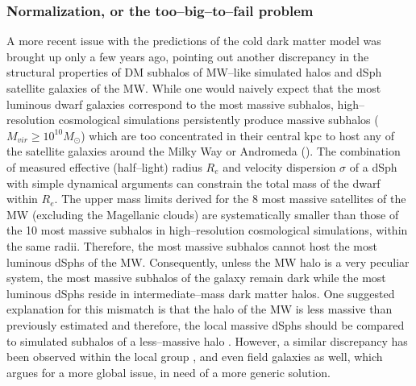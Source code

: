 \documentclass[paper=a4, fontsize=11pt]{scrartcl} %
\numberwithin{equation}{section} %
\numberwithin{figure}{section} %
\numberwithin{table}{section} %
\begin{document}
\subsubsection{Normalization, or the too--big--to--fail problem}
\label{subsec:too-big-to-fail}
A more recent issue with the predictions of the cold dark matter model was brought up only a few years ago, pointing out another discrepancy in the structural properties of DM subhalos of MW--like simulated halos and dSph satellite galaxies of the MW. While one would naively expect that the most luminous dwarf galaxies correspond to the most massive subhalos, high--resolution cosmological simulations persistently produce massive subhalos ($M_{vir} \geq 10^{10} M_\odot$) which are too concentrated in their central kpc to host any of the satellite galaxies around the Milky Way or Andromeda (\cite{Boylan-Kolchin+2011, Boylan--Kolchin+2012}). The combination of measured effective (half--light) radius $R_e$ and velocity dispersion $\sigma$ of a dSph with simple dynamical arguments can constrain the total mass of the dwarf within $R_e$. The upper mass limits derived for the 8 most massive satellites of the MW (excluding the Magellanic clouds) are systematically smaller than those of the 10 most massive subhalos in high--resolution cosmological simulations, within the same radii. Therefore, the most massive subhalos cannot host the most luminous dSphs of the MW. Consequently, unless the MW halo is a very peculiar system, the most massive subhalos of the galaxy remain dark while the most luminous dSphs reside in intermediate--mass dark matter halos. 
One suggested explanation for this mismatch is that the halo of the MW is less massive than previously estimated and therefore, the local massive dSphs should be compared to simulated subhalos of a less--massive halo \citep[][]{Boylan--Kolchin+2012, Wang+2012, Vera--Ciro+2013}. However, a similar discrepancy has been observed within the local group \citep[][]{Kirby+2014, Garrison--Kimmel+2014, Tollerud+2014}, and even field galaxies \citep[][]{Papastergis+2015} as well, which argues for a more global issue, in need of a more generic solution. 

\end{document}
